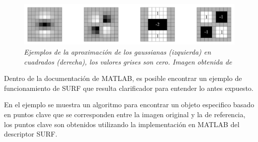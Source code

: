 \begin{figure}[hp]
  \centering
  \includegraphics[scale=.6]{images/gaussian}
  \caption{\em Ejemplos de la aproximación de los gaussianas (izquierda) en cuadrados (derecha), los valores grises son cero. Imagen obtenida de \cite{Bay2006} }  
  \label{fig:gaussians}
\end{figure}

Dentro de la documentación de MATLAB, es posible encontrar un ejemplo de funcionamiento de SURF que resulta clarificador para entender lo antes expuesto.

En el ejemplo se muestra un algoritmo para encontrar un objeto especifico basado en puntos clave que se corresponden entre la imagen original y la de referencia, los puntos clave son obtenidos utilizando la implementación en MATLAB del descriptor SURF.


